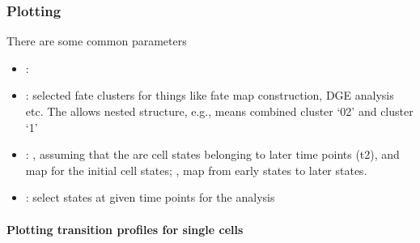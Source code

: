 \documentclass[letterpaper,10pt,english]{sphinxmanual}
\begin{document}
\subsubsection{Plotting}
\label{\detokenize{20210121_all_hematopoietic_data:Plotting}}
There are some common parameters
\begin{itemize}
\item {} 
: 

\item {} 
: selected fate clusters for things like fate map construction, DGE analysis etc. The  allows nested structure, e.g.,  means combined cluster ‘0\sphinxhyphen{}2’ and cluster ‘1’

\item {} 
: , assuming that the  are cell states belonging to later time points (t2), and map for the initial cell states; , map from early states to later states.

\item {} 
: select states at given time points for the analysis

\end{itemize}


\paragraph{Plotting transition profiles for single cells}
\label{\detokenize{20210121_all_hematopoietic_data:Plotting-transition-profiles-for-single-cells}}
{
\begin{sphinxVerbatim}[commandchars=\\\{\}]
\llap{\color{nbsphinxin}[12]:\,\hspace{\fboxrule}\hspace{\fboxsep}}\PYG{p}{[}\PYG{p}{]}

\end{sphinxVerbatim}
}
\end{document}
